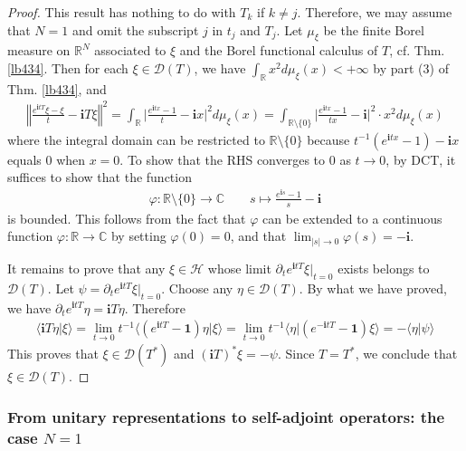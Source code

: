 \documentclass[12pt,b5paper,notitlepage]{article}
\theoremstyle{definition}
\theoremstyle{plain}
\newcommand{\idt}{\mathbf{1}}
\newcommand{\Dom}{\mathscr{D}}
\newcommand{\bk}[1]{\langle {#1}\rangle}
\newcommand{\im}{\mathbf{i}}
\newcommand{\Cbb}{\mathbb C}
\newcommand{\Rbb}{\mathbb R}
\newcommand{\MH}{\mathcal H}
\numberwithin{equation}{section}
\begin{document}
\begin{proof}
This result has nothing to do with $T_k$ if $k\neq j$. Therefore, we may assume that $N=1$ and omit the subscript $j$ in $t_j$ and $T_j$. Let $\mu_\xi$ be the finite Borel measure on $\Rbb^N$ associated to $\xi$ and the Borel functional calculus of $T$, cf. Thm. \ref{lb434}. Then for each $\xi\in\Dom(T)$, we have $\int_\Rbb x^2d\mu_\xi(x)<+\infty$ by part (3) of Thm. \ref{lb434}, and
\begin{align*}
\left\Vert\frac{e^{\im tT}\xi-\xi}t-\im T\xi  \right\Vert^2=\int_\Rbb \Big|\frac{e^{\im tx}-1}t-\im x\Big|^2d\mu_\xi(x)=\int_{\Rbb\setminus\{0\}} \Big|\frac{e^{\im tx}-1}{tx}-\im \Big|^2\cdot x^2d\mu_\xi(x)
\end{align*}
where the integral domain can be restricted to $\Rbb\setminus\{0\}$ because $t^{-1}(e^{\im tx}-1)-\im x$ equals $0$ when $x=0$. To show that the RHS converges to $0$ as $t\rightarrow0$, by DCT, it suffices to show that the function
\begin{align*}
\varphi:\Rbb\setminus\{0\}\rightarrow\Cbb\qquad s\mapsto \frac{e^{\im s}-1}{s}-\im
\end{align*}
is bounded. This follows from the fact that $\varphi$ can be extended to a continuous function $\varphi:\Rbb\rightarrow\Cbb$ by setting $\varphi(0)=0$, and that $\lim_{|s|\rightarrow0}\varphi(s)=-\im$.

It remains to prove that any $\xi\in\MH$ whose limit $\partial_t e^{\im tT}\xi|_{t=0}$ exists belongs to $\Dom(T)$. Let $\psi=\partial_t e^{\im tT}\xi|_{t=0}$. Choose any $\eta\in\Dom(T)$. By what we have proved, we have $\partial_t e^{\im tT}\eta=\im T\eta$. Therefore
\begin{align*}
\bk{\im T\eta|\xi}=\lim_{t\rightarrow0}t^{-1}\bk{(e^{\im tT}-\idt)\eta|\xi}=\lim_{t\rightarrow0}t^{-1}\bk{\eta|(e^{-\im tT}-\idt)\xi}=-\bk{\eta|\psi}
\end{align*}
This proves that $\xi\in\Dom(T^*)$ and $(\im T)^*\xi=-\psi$. Since $T=T^*$, we conclude that $\xi\in\Dom(T)$.
\end{proof}











\subsubsection{From unitary representations to self-adjoint operators: the case $N=1$}
\end{document}
